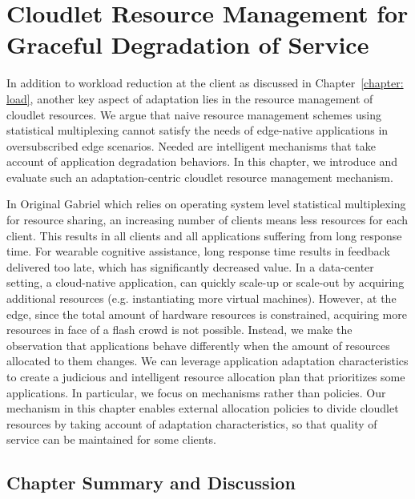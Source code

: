 \chapter{Cloudlet Resource Management for Graceful Degradation of Service}
\label{chapter: cloudlet}

In addition to workload reduction at the client as discussed in
Chapter~\ref{chapter: load}, another key aspect of adaptation lies in the
resource management of cloudlet resources. We argue that naive resource
management schemes using statistical multiplexing cannot satisfy the needs of
edge-native applications in oversubscribed edge scenarios. Needed are
intelligent mechanisms that take account of application degradation behaviors.
In this chapter, we introduce and evaluate such an adaptation-centric cloudlet
resource management mechanism.

In Original Gabriel which relies on operating system level statistical
multiplexing for resource sharing, an increasing number of clients means less
resources for each client. This results in all clients and all applications
suffering from long response time. For wearable cognitive assistance, long
response time results in feedback delivered too late, which has significantly
decreased value. In a data-center setting, a cloud-native application, can
quickly scale-up or scale-out by acquiring additional resources (e.g.
instantiating more virtual machines). However, at the edge, since the total
amount of hardware resources is constrained, acquiring more resources in face of
a flash crowd is not possible. Instead, we make the observation that
applications behave differently when the amount of resources allocated to them
changes. We can leverage application adaptation characteristics to create a
judicious and intelligent resource allocation plan that prioritizes some
applications. In particular, we focus on mechanisms rather than policies. Our
mechanism in this chapter enables external allocation policies to divide
cloudlet resources by taking account of adaptation characteristics, so that
quality of service can be maintained for some clients.








\section{Chapter Summary and Discussion}
\label{cloudlet: summary}

